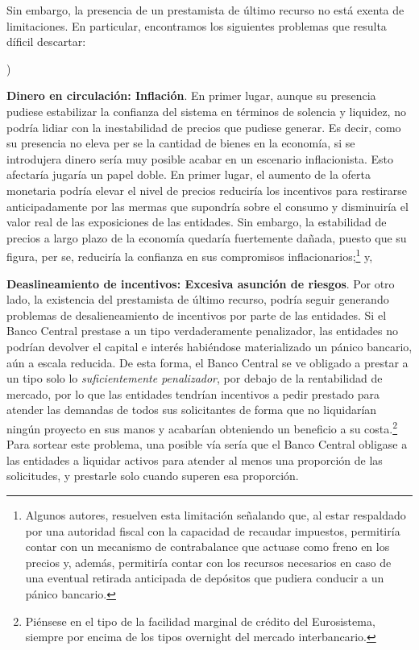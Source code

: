 \documentclass[10pt,a4paper]{article}
\newcounter{alphaitem}
\newenvironment{la}
      {\begin{list}{\alph{alphaitem})}{%
          \usecounter{alphaitem}%
          \setlength{\leftmargin}{1cm}%
          \setlength{\parskip}{3pt}%
          \setlength{\itemsep}{0pt}%
          \setlength{\parsep}{0pt}%
      }}
      {\end{list}}
\begin{document}
Sin embargo, la presencia de un prestamista de último recurso no está exenta de limitaciones. En particular, encontramos los siguientes problemas que resulta díficil descartar:
\begin{la}
    \item \textbf{Dinero en circulación: Inflación}. En primer lugar, aunque su presencia pudiese estabilizar la confianza del sistema en términos de solencia y liquidez, no podría lidiar con la inestabilidad de precios que pudiese generar. Es decir, como su presencia no eleva per se la cantidad de bienes en la economía, si se introdujera dinero sería muy posible acabar en un escenario inflacionista. Esto afectaría jugaría un papel doble. En primer lugar, el aumento de la oferta monetaria podría elevar el nivel de precios reduciría los incentivos para restirarse anticipadamente por las mermas que supondría sobre el consumo y disminuiría el valor real de las exposiciones de las entidades. Sin embargo, la estabilidad de precios a largo plazo de la economía quedaría fuertemente dañada, puesto que su figura, per se, reduciría la confianza en sus compromisos inflacionarios;\footnote{%
        Algunos autores, resuelven esta limitación señalando que, al estar respaldado por una autoridad fiscal con la capacidad de recaudar impuestos, permitiría contar con un mecanismo de contrabalance que actuase como freno en los precios y, además, permitiría contar con los recursos necesarios en caso de una eventual retirada anticipada de depósitos que pudiera conducir a un pánico bancario.
    } y,
    \item \textbf{Deaslineamiento de incentivos: Excesiva asunción de riesgos}. Por otro lado, la existencia del prestamista de último recurso, podría seguir generando problemas de desalieneamiento de incentivos por parte de las entidades. Si el Banco Central prestase a un tipo verdaderamente penalizador, las entidades no podrían devolver el capital e interés habiéndose materializado un pánico bancario, aún a escala reducida. De esta forma, el Banco Central se ve obligado a prestar a un tipo solo lo \textit{suficientemente penalizador}, por debajo de la rentabilidad de mercado, por lo que las entidades tendrían incentivos a pedir prestado para atender las demandas de todos sus solicitantes de forma que no liquidarían ningún proyecto en sus manos y acabarían obteniendo un beneficio a su costa.\footnote{%
        Piénsese en el tipo de la facilidad marginal de crédito del Eurosistema, siempre por encima de los tipos overnight del mercado interbancario.
    } Para sortear este problema, una posible vía sería que el Banco Central obligase a las entidades a liquidar activos para atender al menos una proporción de las solicitudes, y prestarle solo cuando superen esa proporción. 
\end{la}
\end{document}
